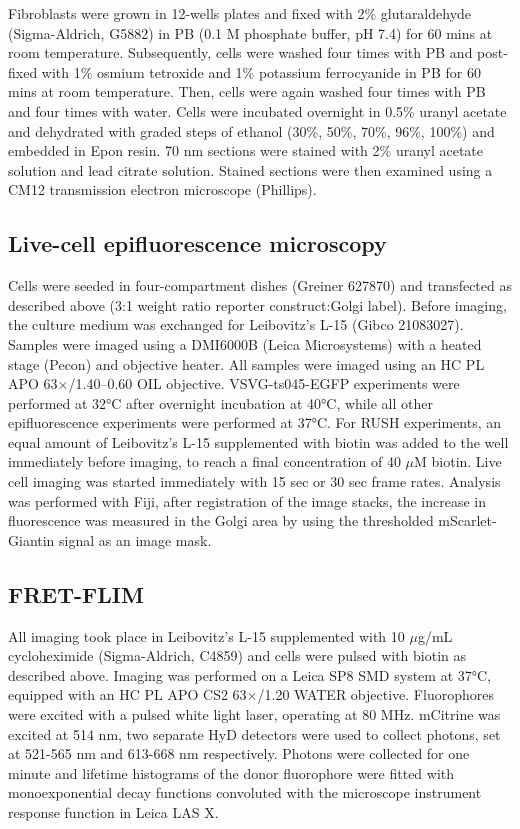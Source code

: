 Fibroblasts were grown in 12-wells plates and fixed with 2\% glutaraldehyde (Sigma-Aldrich, G5882) in PB (0.1 M phosphate buffer, pH 7.4) for 60 mins at room temperature. Subsequently, cells were washed four times with PB and post-fixed with 1\% osmium tetroxide and 1\% potassium ferrocyanide in PB for 60 mins at room temperature. Then, cells were again washed four times with PB and four times with water. Cells were incubated overnight in 0.5\% uranyl acetate and dehydrated with graded steps of ethanol (30\%, 50\%, 70\%, 96\%, 100\%) and embedded in Epon resin. 70 nm sections were stained with 2\% uranyl acetate solution and lead citrate solution. Stained sections were then examined using a CM12 transmission electron microscope (Phillips).

\subsection{Live-cell epifluorescence microscopy}

Cells were seeded in four-compartment dishes (Greiner 627870) and transfected as described above (3:1 weight ratio reporter construct:Golgi label). Before imaging, the culture medium was exchanged for Leibovitz’s L-15 (Gibco 21083027). Samples were imaged using a DMI6000B (Leica Microsystems) with a heated stage (Pecon) and objective heater. All samples were imaged using an HC PL APO 63$\times$/1.40–0.60 OIL objective. VSVG-ts045-EGFP experiments were performed at 32°C after overnight incubation at 40°C, while all other epifluorescence experiments were performed at 37°C. For RUSH experiments, an equal amount of Leibovitz’s L-15 supplemented with biotin was added to the well immediately before imaging, to reach a final concentration of 40 $\mu$M biotin. Live cell imaging was started immediately with 15 sec or 30 sec frame rates. Analysis was performed with Fiji, after registration of the image stacks, the increase in fluorescence was measured in the Golgi area by using the thresholded mScarlet-Giantin signal as an image mask.

\subsection{FRET-FLIM}

All imaging took place in Leibovitz’s L-15 supplemented with 10 $\mu$g/mL cycloheximide (Sigma-Aldrich, C4859) and cells were pulsed with biotin as described above. Imaging was performed on a Leica SP8 SMD system at 37°C, equipped with an HC PL APO CS2 63$\times$/1.20 WATER objective. Fluorophores were excited with a pulsed white light laser, operating at 80 MHz. mCitrine was excited at 514 nm, two separate HyD detectors were used to collect photons, set at 521-565 nm and 613-668 nm respectively. Photons were collected for one minute and lifetime histograms of the donor fluorophore were fitted with monoexponential decay functions convoluted with the microscope instrument response function in Leica LAS X.

